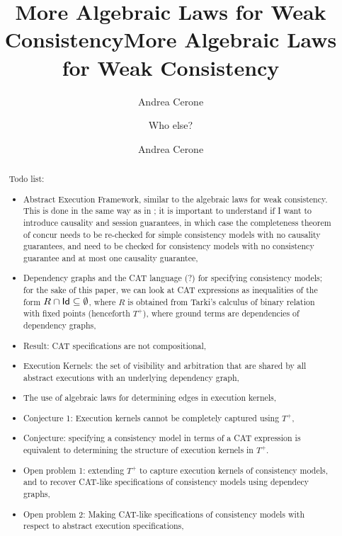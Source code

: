 \documentclass[a4paper,UKenglish]{article}%
\title{More Algebraic Laws for Weak Consistency}
\title{More Algebraic Laws for Weak Consistency}
\author[1]{Andrea Cerone}
\author{Who else?}
\affil[1]{Imperial College London, UK}
\author[1]{Andrea Cerone}
\affil[1]{Imperial College London, UK, \texttt{a.cerone@imperial.ac.uk}}
\theoremstyle{plain}
\begin{document}
%


\maketitle

\begin{abstract}
Todo list: 
\begin{itemize}
\item Abstract Execution Framework, similar to the algebraic laws for weak consistency. This 
is done in the same way as in \cite{laws}; it is important to understand if I want to introduce 
causality and session guarantees, in which case the completeness theorem of concur needs 
to be re-checked for simple consistency models with no causality guarantees, and 
need to be checked for consistency models with no consistency guarantee and at most 
one causality guarantee,
\item Dependency graphs and the CAT language (?) for specifying consistency models; for the 
sake of this paper, we can look at CAT expressions as inequalities of the form $R \cap \mathsf{Id} \subseteq \emptyset$, 
where $R$ is obtained from Tarki's calculus of binary relation with fixed points (henceforth $T^{+}$), where ground 
terms are dependencies of dependency graphs, 
\item Result: CAT specifications are not compositional,
\item Execution Kernels: the set of visibility and arbitration that are shared by all abstract 
executions with an underlying dependency graph, 
\item The use of algebraic laws for determining edges in execution kernels, 
\item Conjecture 1: Execution kernels cannot be completely captured using $T^{+}$,
\item Conjecture: specifying a consistency model in terms of a CAT expression is equivalent  
to determining the structure of execution kernels in $T^{+}$. 
\item Open problem 1: extending $T^{+}$ to capture execution kernels of consistency models, 
and to recover CAT-like specifications of consistency models using dependecy graphs,
\item Open problem 2: Making CAT-like specifications of consistency models with respect to 
abstract execution specifications,
\end{itemize}
\end{abstract}
\end{document}
